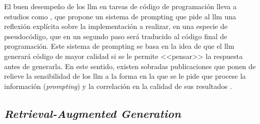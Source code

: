 El buen desempeño de los \gls{llm} en tareas de código de programación lleva a estudios como \cite{liStructuredChainofThoughtPrompting2023}, que propone un sistema de prompting que pide al \gls{llm} una reflexión explícita sobre la implementación a realizar, en una especie de pseudocódigo, que en un segundo paso será traducido al código final de programación. Este sistema de prompting se basa en la idea de que el \gls{llm} generará código de mayor calidad si se le permite <<pensar>> la respuesta antes de generarla. En este sentido, existen sobradas publicaciones que ponen de relieve la sensibilidad de los \gls{llm} a la forma en la que se le pide que procese la información (\textit{prompting}) y la correlación en la calidad de sus resultados \citep{zhouLeasttoMostPromptingEnables2023,weiChainofThoughtPromptingElicits2023,LLMPromptingGuide}.
 
\subsection{\textit{Retrieval-Augmented Generation}}

